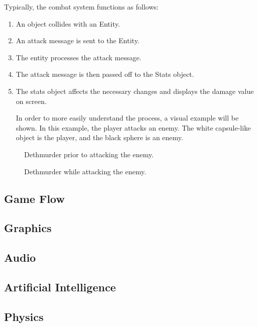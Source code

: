 \documentclass{article}
\begin{document}
Typically, the combat system functions as follows:
\begin{enumerate}

\item An object collides with an Entity.
\item An attack message is sent to the Entity.
\item The entity processes the attack message.
\item The attack message is then passed off to the Stats object.
\item The stats object affects the necessary changes and displays the damage value on screen.

In order to more easily understand the process, a visual example will be shown.  In this example, the player attacks an enemy.  The white capsule-like object is the player, and the black sphere is an enemy.

\end{enumerate}

\begin{figure}[h!]

\caption{Dethmurder prior to attacking the enemy.}
\label{PreHit}

\end{figure}

\begin{figure}[h!]

\caption{Dethmurder while attacking the enemy.}
\label{DuringHit}

\end{figure}

\subsection{Game Flow}

\subsection{Graphics}

\subsection{Audio}

\subsection{Artificial Intelligence}

\subsection{Physics}
\end{document}
